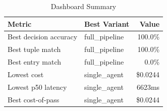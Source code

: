 \begin{table}[htbp]
\centering
\caption{Dashboard Summary}
\label{tab:summary}
\begin{tabular}{l l r}
\toprule
Metric & Best Variant & Value \\
\midrule
  Best decision accuracy & full\_pipeline & 100.0\% \\
  Best tuple match & full\_pipeline & 100.0\% \\
  Best entry match & full\_pipeline & 0.0\% \\
  Lowest cost & single\_agent & \$0.0244 \\
  Lowest p50 latency & single\_agent & 6623ms \\
  Best cost-of-pass & single\_agent & \$0.0244 \\
\bottomrule
\end{tabular}
\end{table}
